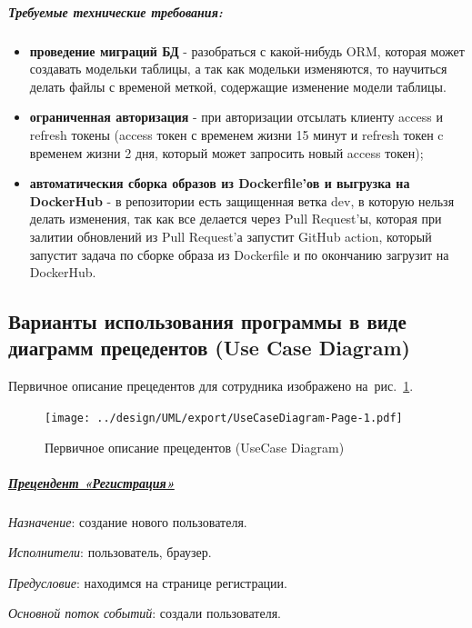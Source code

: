 \subparagraph{Требуемые технические требования:}\hspace{0pt}

\begin{itemize}
  \item \textbf{проведение миграций БД} - разобраться с какой-нибудь ORM, которая может создавать модельки таблицы,
  а так как модельки изменяются, то научиться делать файлы с временой меткой, содержащие изменение модели таблицы.
  \item \textbf{ограниченная авторизация} - при авторизации отсылать клиенту access и refresh токены
  (access токен с временем жизни 15 минут и refresh токен c временем жизни 2 дня,
  который может запросить новый access токен);
  \item \textbf{автоматическия сборка образов из Dockerfile'ов и выгрузка на DockerHub} - в репозитории есть защищенная ветка dev,
  в которую нельзя делать изменения, так как все делается через Pull Request'ы, которая при залитии обновлений из Pull Request'а
  запустит GitHub action, который запустит задача по сборке образа из Dockerfile и по окончанию загрузит на DockerHub.
\end{itemize}

\newpage
\subsection{Варианты использования программы в виде диаграмм прецедентов (Use Case Diagram)}

Первичное описание прецедентов для сотрудника изображено на~рис.~\ref{fig:UseCaseDiagram}.

\begin{figure}[!ph]
  \centering

  \texttt{[image: ../design/UML/export/UseCaseDiagram-Page-1.pdf]}

  \caption{Первичное описание прецедентов (UseCase Diagram)}
  \label{fig:UseCaseDiagram}
\end{figure}


\subparagraph{\underline{Прецендент «Регистрация»}} \hspace{0pt}

\textit{Назначение}: создание нового пользователя.

\textit{Исполнители}: пользователь, браузер.

\textit{Предусловие}: находимся на странице регистрации.

\textit{Основной поток событий}: создали пользователя.

